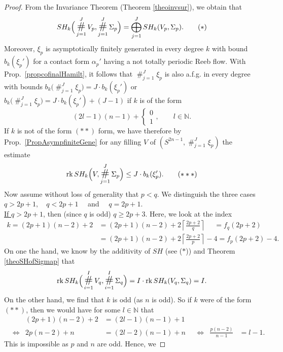 \documentclass[a4paper,12pt,bibliography=totocnumbered,titlepage=false,abstracton,bookmarksnumbered=true]{scrartcl}
\DeclareMathOperator*{\consumt}{\#}
\DeclareMathOperator*{\consumd}{\text{\Large$\#$}}
\DeclareMathOperator{\rk}{rk}
\theoremstyle{definition}
\begin{document}
\begin{proof}
 From the Invariance Theorem (Theorem \ref{theoinvsur}), we obtain that
 \begin{align*}
   SH_k\Big(\consumd_{j=1}^J V_p,\consumd_{j=1}^J \Sigma_p\Big)= \bigoplus_{j=1}^J SH_k(V_p,\Sigma_p).\tag{$\ast$}
 \end{align*}
 Moreover, $\xi_p$ is asymptotically finitely generated in every degree $k$ with bound $b_k(\xi_p')$ for a contact form $\alpha_p'$ having a not totally periodic Reeb flow. With Prop.\ \ref{propcofinalHamilt}, it follows that $\consumt_{j=1}^J\xi_p$ is also a.f.g. in every degree with bounds $b_k\big(\consumt_{j=1}^J\xi_p\big)=J{\cdot}b_k(\xi_p')$ or $b_k\big(\consumt_{j=1}^J\xi_p\big)=J{\cdot}b_k(\xi_p')+(J{-}1)$ if $k$ is of the form
 \[(2l{-}1)(n{-}1)+\left\lbrace\begin{smallmatrix}0\\1\end{smallmatrix}\right.,\qquad l\in\mathbb{N}.\tag{$\ast\ast$}\]
 If $k$ is not of the form $(\ast\ast)$ form, we have therefore by Prop.\ \ref{PropAsympfiniteGene} for any filling $V$ of $(S^{2n-1}, \consumt_{j=1}^J\xi_p)$ the estimate
 \[\rk SH_k\Big(V,\consumd_{j=1}^J\Sigma_p\Big)\leq J\cdot b_k(\xi_p').\tag{$\ast\ast\ast$}\]
 Now assume without loss of generality that $p<q$. We distinguish the three cases $q>2p{+}1,\quad q<2p{+}1\quad$ and $\quad q=2p{+}1$.\bigskip\\
 \underline{If $q>2p{+}1$}, then (since $q$ is odd) $q\geq2p{+}3$. Here, we look at the index
 \begin{align*}
  k=(2p{+}1)(n{-}2)+2&=(2p{+}1)(n{-}2)+2\left\lceil\frac{2p{+}2}{q}\right\rceil\phantom{-4} = f_q(2p{+}2)\\
  &= (2p{+}1)(n{-}2)+2\left\lceil\frac{2p{+}2}{p}\right\rceil{-}4=f_p(2p{+}2)-4.
 \end{align*}
 On one the hand, we know by the additivity of $SH$ (see ($\ast$)) and Theorem \ref{theoSHofSigmap} that
 \[\rk SH_k\Big(\consumd_{i=1}^I V_q,\consumd_{i=1}^I \Sigma_q\Big)=I\cdot \rk SH_k(V_q,\Sigma_q) = I.\]
 On the other hand, we find that $k$ is odd (as $n$ is odd). So if $k$ were of the form $(\ast\ast)$, then we would have for some $l\in\mathbb{N}$ that
 \begin{align*}
  &&(2p{+}1)(n{-}2)+2&=(2l{-}1)(n{-}1)+1 \\
  &\Leftrightarrow& 2p(n{-}2)+n&=(2l{-}2)(n{-}1)+n &&\Leftrightarrow& \frac{p(n{-}2)}{n{-}1}&=l{-}1.
 \end{align*}
This is impossible as $p$ and $n$ are odd. Hence, we

\end{proof}
\end{document}
